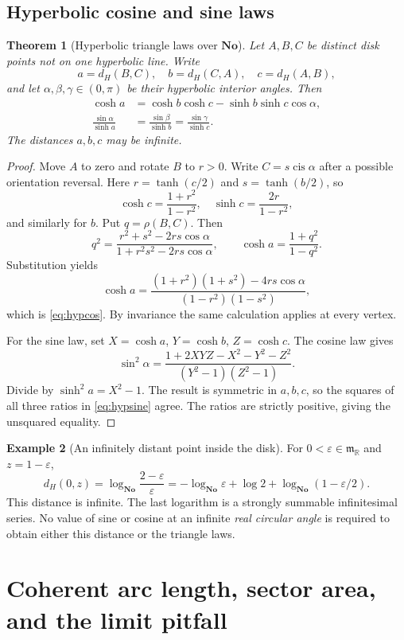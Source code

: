 \documentclass[11pt]{article}
\numberwithin{equation}{section}
\newtheorem{theorem}{Theorem}[section]
\theoremstyle{definition}
\newtheorem{example}[theorem]{Example}
\newcommand{\No}{\mathbf{No}}
\newcommand{\R}{\mathbb R}
\newcommand{\mm}{\mathfrak m}
\newcommand{\eps}{\varepsilon}
\newcommand{\cis}{\operatorname{cis}}
\begin{document}
\subsection{Hyperbolic cosine and sine laws}
\begin{theorem}[Hyperbolic triangle laws over $\No$]\label{thm:hyperbolic}
Let $A,B,C$ be distinct disk points not on one hyperbolic line. Write
\[
 a=d_H(B,C),\quad b=d_H(C,A),\quad c=d_H(A,B),
\]
and let $\alpha,\beta,\gamma\in(0,\pi)$ be their hyperbolic interior angles. Then
\begin{align}
 \cosh a&=\cosh b\cosh c-\sinh b\sinh c\cos\alpha,
 \label{eq:hypcos}\\
 \frac{\sin\alpha}{\sinh a}
 &=\frac{\sin\beta}{\sinh b}
 =\frac{\sin\gamma}{\sinh c}.
 \label{eq:hypsine}
\end{align}
The distances $a,b,c$ may be infinite.
\end{theorem}
\begin{proof}
Move $A$ to zero and rotate $B$ to $r>0$. Write $C=s\cis\alpha$ after a possible orientation reversal. Here $r=\tanh(c/2)$ and $s=\tanh(b/2)$, so
\[
 \cosh c=\frac{1+r^2}{1-r^2},\quad
 \sinh c=\frac{2r}{1-r^2},
\]
and similarly for $b$. Put $q=\rho(B,C)$. Then
\[
 q^2=\frac{r^2+s^2-2rs\cos\alpha}
           {1+r^2s^2-2rs\cos\alpha},\qquad
 \cosh a=\frac{1+q^2}{1-q^2}.
\]
Substitution yields
\[
 \cosh a=
 \frac{(1+r^2)(1+s^2)-4rs\cos\alpha}
 {(1-r^2)(1-s^2)},
\]
which is \eqref{eq:hypcos}. By invariance the same calculation applies at every vertex.

For the sine law, set $X=\cosh a$, $Y=\cosh b$, $Z=\cosh c$. The cosine law gives
\[
 \sin^2\alpha
 =\frac{1+2XYZ-X^2-Y^2-Z^2}{(Y^2-1)(Z^2-1)}.
\]
Divide by $\sinh^2a=X^2-1$. The result is symmetric in $a,b,c$, so the squares of all three ratios in \eqref{eq:hypsine} agree. The ratios are strictly positive, giving the unsquared equality.
\end{proof}

\begin{example}[An infinitely distant point inside the disk]
For $0<\eps\in\mm_{\R}$ and $z=1-\eps$,
\[
 d_H(0,z)=\log_{\No}\frac{2-\eps}{\eps}
 =-\log_{\No}\eps+\log 2+\log_{\No}(1-\eps/2).
\]
This distance is infinite. The last logarithm is a strongly summable infinitesimal series. No value of sine or cosine at an infinite \emph{real circular angle} is required to obtain either this distance or the triangle laws.
\end{example}

\section{Coherent arc length, sector area, and the limit pitfall}\label{sec:arcs}
\end{document}
